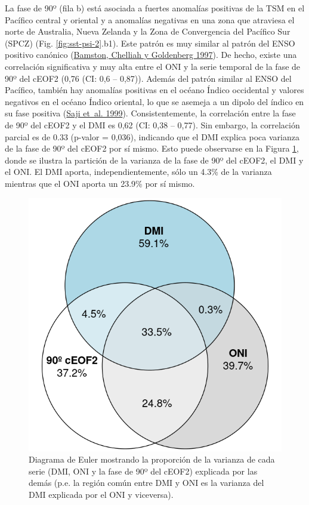 \documentclass[12pt,oneside,a4paper]{reedthesis}
\begin{document}
La fase de 90º (fila b) está asociada a fuertes anomalías positivas de la TSM en el Pacífico central y oriental y a anomalías negativas en una zona que atraviesa el norte de Australia, Nueva Zelanda y la Zona de Convergencia del Pacífico Sur (SPCZ) (Fig. \ref{fig:sst-psi-2}.b1).
Este patrón es muy similar al patrón del ENSO positivo canónico (\protect\hyperlink{ref-bamston1997}{Bamston, Chelliah y Goldenberg 1997}).
De hecho, existe una correlación significativa y muy alta entre el ONI y la serie temporal de la fase de 90º del cEOF2 (0,76 (CI: 0,6 -- 0,87)).
Además del patrón similar al ENSO del Pacífico, también hay anomalías positivas en el océano Índico occidental y valores negativos en el océano Índico oriental, lo que se asemeja a un dipolo del índico en su fase positiva (\protect\hyperlink{ref-saji1999}{Saji et~al. 1999}).
Consistentemente, la correlación entre la fase de 90º del cEOF2 y el DMI es 0,62 (CI: 0,38 -- 0,77).
Sin embargo, la correlación parcial es de 0.33 (p-valor = 0,036), indicando que el DMI explica poca varianza de la fase de 90º del cEOF2 por sí mismo.
Esto puede observarse en la Figura \ref{fig:euler}, donde se ilustra la partición de la varianza de la fase de 90º del cEOF2, el DMI y el ONI.
El DMI aporta, independientemente, sólo un 4.3\% de la varianza mientras que el ONI aporta un 23.9\% por sí mismo.

\begin{figure}

{\centering \includegraphics{figures/20-ceofs/euler-1} 

}

\caption{Diagrama de Euler mostrando la proporción de la varianza de cada serie (DMI, ONI y la fase de 90º del cEOF2) explicada por las demás (p.e. la región común entre DMI y ONI es la varianza del DMI explicada por el ONI y viceversa).}\label{fig:euler}
\end{figure}
\end{document}
